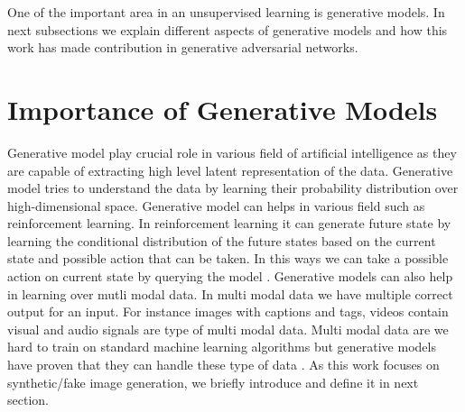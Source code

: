 \par

One of the important area in an unsupervised learning is generative models.  In next subsections we explain different aspects of generative models and how this work has made contribution in generative adversarial networks.

\section{Importance of Generative Models}

Generative model play crucial role in various field of artificial intelligence as they are capable of extracting high level latent representation of the data. Generative model tries to understand the data by learning their probability distribution over high-dimensional space. Generative model can helps in various field such as reinforcement learning. In reinforcement learning it can generate future state by learning the conditional distribution of the future states based on the current state and possible action that can be taken. In this ways we can take a possible action on current state by querying the model \cite{finn}. Generative models can also help in learning over mutli modal data. In multi modal data we have multiple correct output for an input. For instance images with captions and tags, videos contain visual and audio signals are type of multi modal data. Multi modal data are we hard to train on standard machine learning algorithms but generative models have proven that they can handle these type of data \cite{srivastava2012}. As this work focuses on synthetic/fake image generation, we briefly introduce and define it in next section.







